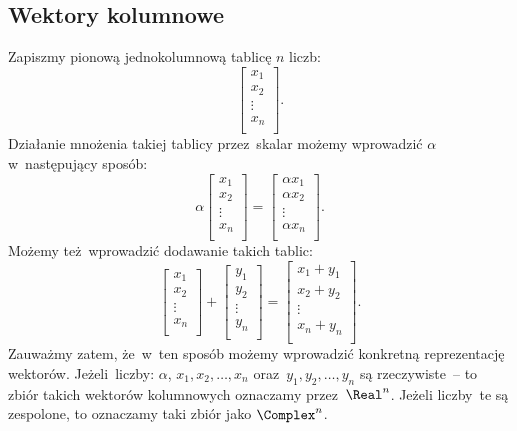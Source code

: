 \subsection{Wektory kolumnowe}
Zapiszmy pionową jednokolumnową tablicę $n$ liczb:
$$
	\begin{bmatrix}
		x_1    \\
		x_2    \\
		\vdots \\
		x_{n}  \\
	\end{bmatrix}.
$$
Działanie mnożenia takiej tablicy przez~skalar możemy wprowadzić $\alpha$ w~następujący sposób:
$$
	\alpha
	\begin{bmatrix}
		x_1    \\
		x_2    \\
		\vdots \\
		x_{n}  \\
	\end{bmatrix}=
	\begin{bmatrix}
		\alpha x_1   \\
		\alpha x_2   \\
		\vdots       \\
		\alpha x_{n} \\
	\end{bmatrix}.
$$
Możemy też~wprowadzić dodawanie takich tablic:
$$
	\begin{bmatrix}
		x_1    \\
		x_2    \\
		\vdots \\
		x_{n}  \\
	\end{bmatrix} +
	\begin{bmatrix}
		y_1    \\
		y_2    \\
		\vdots \\
		y_{n}  \\
	\end{bmatrix} =
	\begin{bmatrix}
		x_1 + y_1     \\
		x_2 + y_2     \\
		\vdots        \\
		x_{n} + y_{n} \\
	\end{bmatrix}.
$$
Zauważmy zatem, że~w~ten sposób możemy wprowadzić
konkretną reprezentację wektorów. Jeżeli~liczby: $\alpha$,
$x_1, x_2, \ldots, x_{n}$ oraz~$y_1, y_2, \ldots, y_{n}$ są rzeczywiste~-- to zbiór takich wektorów kolumnowych oznaczamy przez~$\Real^n$.
Jeżeli liczby~te są zespolone, to oznaczamy taki zbiór jako
$\Complex^n$.

